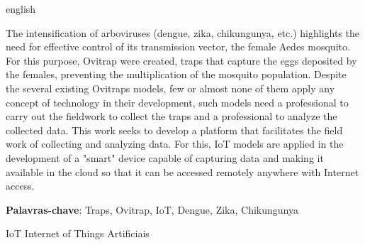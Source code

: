\documentclass[
	12pt,				%
	openright,			%
	oneside,			%
	a4paper,			%
	chapter=TITLE,		%
	english,			%
	brazil				%
	]{abntex2}
\begin{document}
\begin{resumo}[Abstract]
\begin{otherlanguage*}{english}

The intensification of arboviruses (dengue, zika, chikungunya, etc.) highlights the need for effective control of its transmission vector, the female Aedes mosquito. For this purpose, Ovitrap were created, traps that capture the eggs deposited by the females, preventing the multiplication of the mosquito population. Despite the several existing Ovitraps models, few or almost none of them apply any concept of technology in their development, such models need a professional to carry out the fieldwork to collect the traps and a professional to analyze the collected data. This work seeks to develop a platform that facilitates the field work of collecting and analyzing data. For this, IoT models are applied in the development of a "smart" device capable of capturing data and making it available in the cloud so that it can be accessed remotely anywhere with Internet access.

\textbf{Palavras-chave}: Traps, Ovitrap, IoT, Dengue, Zika, Chikungunya

\end{otherlanguage*}
\end{resumo}


\listoffigures*
\cleardoublepage

\listoftables*
\cleardoublepage

\begin{siglas}
  \item[IoT] Internet of Things 
Artificiais 
\end{siglas}

\end{document}
